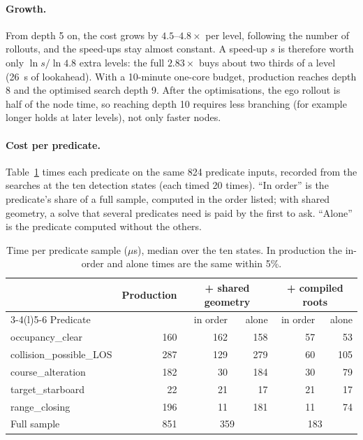 \documentclass[11pt,a4paper]{article}
\begin{document}
\paragraph{Growth.} From depth 5 on, the cost grows by $4.5$--$4.8\times$ per
level, following the number of rollouts, and the speed-ups stay almost
constant. A speed-up $s$ is therefore worth only $\ln s/\ln 4.8$ extra levels:
the full $2.83\times$ buys about two thirds of a level (26~s of lookahead).
With a 10-minute one-core budget, production reaches depth 8 and the optimised
search depth 9. After the optimisations, the ego rollout is half of the node
time, so reaching depth 10 requires less branching (for example longer holds
at later levels), not only faster nodes.

\paragraph{Cost per predicate.} Table~\ref{tab:predicates} times each
predicate on the same 824 predicate inputs, recorded from the searches at the
ten detection states (each timed 20 times). ``In order'' is the predicate's
share of a full sample, computed in the order listed; with shared geometry, a
solve that several predicates need is paid by the first to ask. ``Alone'' is
the predicate computed without the others.

\begin{table}[htbp]
\centering
\caption{Time per predicate sample ($\mu$s), median over the ten states. In
production the in-order and alone times are the same within 5\%.}
\label{tab:predicates}
\small
\begin{tabular}{@{}lrrrrr@{}}
\toprule
 & Production & \multicolumn{2}{c}{+ shared geometry} & \multicolumn{2}{c}{+ compiled roots} \\
\cmidrule(lr){3-4}\cmidrule(l){5-6}
Predicate & & in order & alone & in order & alone \\
\midrule
occupancy\_clear         & 160 & 162 & 158 & 57 & 53 \\
collision\_possible\_LOS & 287 & 129 & 279 & 60 & 105 \\
course\_alteration       & 182 & 30  & 184 & 30 & 79 \\
target\_starboard        & 22  & 21  & 17  & 21 & 17 \\
range\_closing           & 196 & 11  & 181 & 11 & 74 \\
\midrule
Full sample              & 851 & \multicolumn{2}{c}{359} & \multicolumn{2}{c}{183} \\
\bottomrule
\end{tabular}
\end{table}
\end{document}
